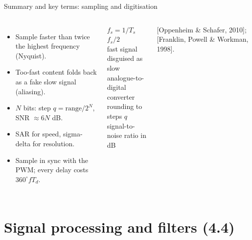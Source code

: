 \documentclass[aspectratio=169,10pt]{beamer}
\begin{document}
\begin{frame}{Summary and key terms: sampling and digitisation}
\begin{columns}[T]
\begin{itemize}\small
\item Sample faster than twice the highest frequency (Nyquist).
\item Too-fast content folds back as a fake slow signal (aliasing).
\item $N$ bits: step $q=\text{range}/2^N$, SNR $\approx 6N$ dB.
\item SAR for speed, sigma-delta for resolution.
\item Sample in sync with the PWM; every delay costs $360^\circ fT_d$.
\end{itemize}
\begin{defbox}
\small
{} $f_s=1/T_s$\\
 $f_s/2$\\
 fast signal disguised as slow\\
 analogue-to-digital converter\\
 rounding to steps $q$\\
 signal-to-noise ratio in dB
\end{defbox}
{\scriptsize\color{mkGray} [Oppenheim \& Schafer, 2010]; [Franklin, Powell \& Workman, 1998].}
\end{columns}
\end{frame}

\section{Signal processing and filters (4.4)}
\end{document}

